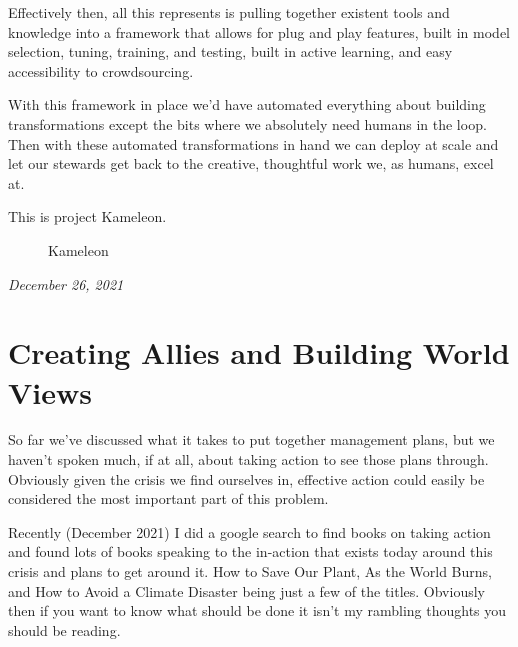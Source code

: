 \documentclass[10pt,a5paper]{book}
\begin{document}
Effectively then, all this represents is pulling together existent tools and knowledge into a framework that allows for plug and play features, built in model selection, tuning, training, and testing, built in active learning, and easy accessibility to crowdsourcing. 

With this framework in place we'd have automated everything about building transformations except the bits where we absolutely need humans in the loop. Then with these automated transformations in hand we can deploy at scale and let our stewards get back to the creative, thoughtful work we, as humans, excel at. 

This is project Kameleon. 


\begin{figure}[!htb]
\caption{\label{fig:my-label} Kameleon}
\end{figure}


\textit{December 26, 2021}

\section{Creating Allies and Building World Views}
So far we've discussed what it takes to put together management plans, but we haven't spoken much, if at all, about taking action to see those plans through. Obviously given the crisis we find ourselves in, effective action could easily be considered the most important part of this problem. 

Recently (December 2021) I did a google search to find books on taking action and found lots of books speaking to the in-action that exists today around this crisis and plans to get around it. How to Save Our Plant, As the World Burns, and How to Avoid a Climate Disaster being just a few of the titles. Obviously then if you want to know what should be done it isn't my rambling thoughts you should be reading. 
\end{document}
